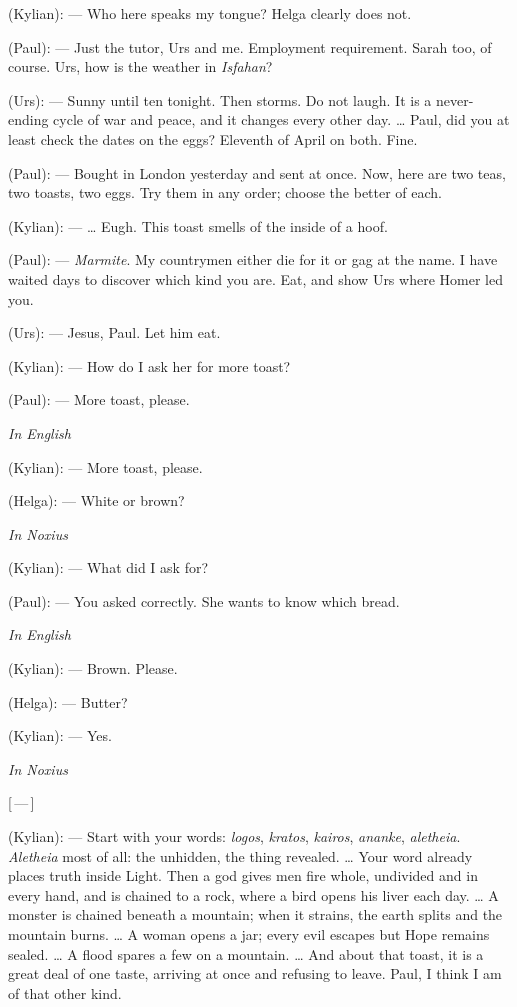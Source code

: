 \begin{room}
(Kylian): --- Who here speaks my tongue? Helga clearly does not.

(Paul): --- Just the tutor, Urs and me. Employment requirement. Sarah too, of course. Urs, how is the weather in \textit{Isfahan}?

(Urs): --- Sunny until ten tonight. Then storms. Do not laugh. It is a never-ending cycle of war and peace, and it changes every other day. \ldots{} Paul, did you at least check the dates on the eggs? Eleventh of April on both. Fine.

(Paul): --- Bought in London yesterday and sent at once. Now, here are two teas, two toasts, two eggs. Try them in any order; choose the better of each.

(Kylian): --- \ldots{} Eugh. This toast smells of the inside of a hoof.

(Paul): --- \textit{Marmite}. My countrymen either die for it or gag at the name. I have waited days to discover which kind you are. Eat, and show Urs where Homer led you.

(Urs): --- Jesus, Paul. Let him eat.

(Kylian): --- How do I ask her for more toast?

(Paul): --- More toast, please.

\textit{In English}\par

(Kylian): --- More toast, please.

(Helga): --- White or brown?

\textit{In Noxius}\par

(Kylian): --- What did I ask for?

(Paul): --- You asked correctly. She wants to know which bread.

\textit{In English}\par

(Kylian): --- Brown. Please.

(Helga): --- Butter?

(Kylian): --- Yes.

\textit{In Noxius}\par

\centerline{[\,---\,]}

(Kylian): --- Start with your words: \textit{logos}, \textit{kratos}, \textit{kairos}, \textit{ananke}, \textit{aletheia}. \textit{Aletheia} most of all: the unhidden, the thing revealed. \ldots{} Your word already places truth inside Light. Then a god gives men fire whole, undivided and in every hand, and is chained to a rock, where a bird opens his liver each day. \ldots{} A monster is chained beneath a mountain; when it strains, the earth splits and the mountain burns. \ldots{} A woman opens a jar; every evil escapes but Hope remains sealed. \ldots{} A flood spares a few on a mountain. \ldots{} And about that toast, it is a great deal of one taste, arriving at once and refusing to leave. Paul, I think I am of that other kind.


\end{room}
